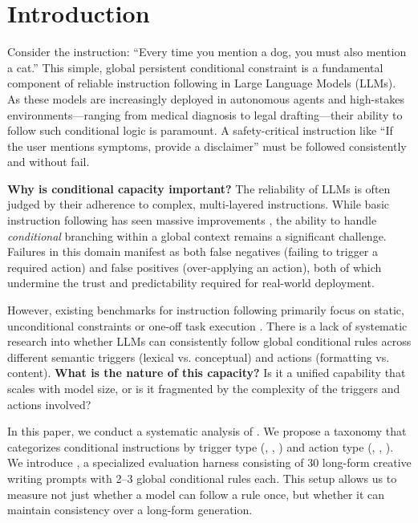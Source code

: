 \section{Introduction}
\label{sec:intro}

Consider the instruction: ``Every time you mention a dog, you must also mention a cat.'' This simple, global persistent conditional constraint is a fundamental component of reliable instruction following in Large Language Models (LLMs). As these models are increasingly deployed in autonomous agents and high-stakes environments---ranging from medical diagnosis to legal drafting---their ability to follow such conditional logic is paramount. A safety-critical instruction like ``If the user mentions symptoms, provide a disclaimer'' must be followed consistently and without fail.

{\bf Why is conditional capacity important?} The reliability of LLMs is often judged by their adherence to complex, multi-layered instructions. While basic instruction following has seen massive improvements \cite{zhou2023ifeval}, the ability to handle \textit{conditional} branching within a global context remains a significant challenge. Failures in this domain manifest as both false negatives (failing to trigger a required action) and false positives (over-applying an action), both of which undermine the trust and predictability required for real-world deployment.

However, existing benchmarks for instruction following primarily focus on static, unconditional constraints or one-off task execution \cite{zhou2023ifeval, qi2025agentif}. There is a lack of systematic research into whether LLMs can consistently follow global conditional rules across different semantic triggers (lexical vs. conceptual) and actions (formatting vs. content). {\bf What is the nature of this capacity?} Is it a unified capability that scales with model size, or is it fragmented by the complexity of the triggers and actions involved?

In this paper, we conduct a systematic analysis of \ifcapacity. We propose a taxonomy that categorizes conditional instructions by trigger type (\lexical, \conceptual, \structural) and action type (\lexical, \formatting, \content). We introduce \benchmark, a specialized evaluation harness consisting of 30 long-form creative writing prompts with 2--3 global conditional rules each. This setup allows us to measure not just whether a model can follow a rule once, but whether it can maintain consistency over a long-form generation.

